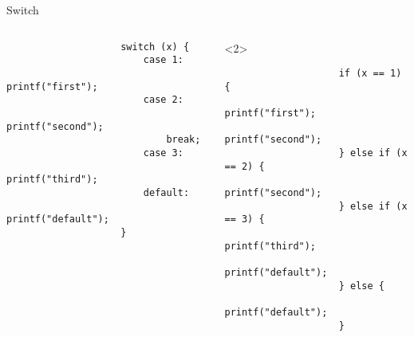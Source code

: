 \documentclass[aspectratio=169,14pt]{beamer}
\begin{document}
    \begin{frame}[fragile]{Switch}
        \begin{columns}
            \begin{column}{0.5\textwidth}
                \begin{verbatim}
                    switch (x) {
                        case 1:
                            printf("first");
                        case 2:
                            printf("second");
                            break;
                        case 3:
                            printf("third");
                        default:
                            printf("default");
                    }
                \end{verbatim}
            \end{column}
            \begin{column}{0.5\textwidth}<2>
                \begin{verbatim}
                    if (x == 1) {
                        printf("first");
                        printf("second");
                    } else if (x == 2) {
                        printf("second");
                    } else if (x == 3) {
                        printf("third");
                        printf("default");
                    } else {
                        printf("default");
                    }
                \end{verbatim}
            \end{column}
        \end{columns}
    \end{frame}
\end{document}
